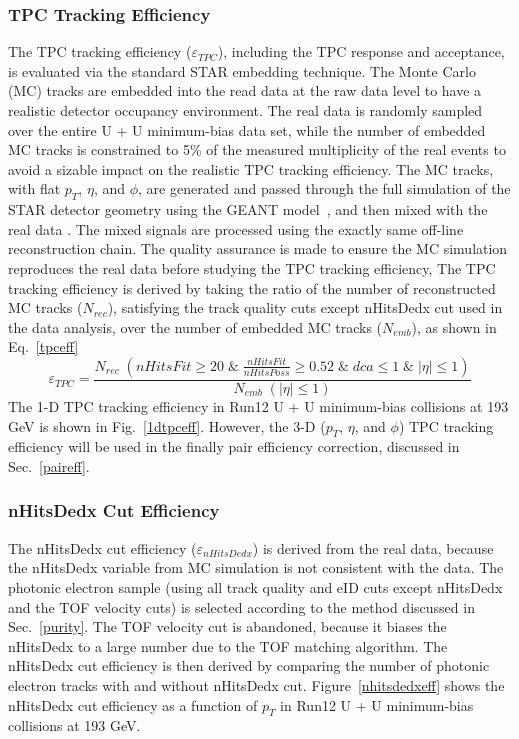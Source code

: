 \subsubsection{TPC Tracking Efficiency}
\label{embedding}
The TPC tracking efficiency ($\varepsilon_{TPC}$), including the TPC response and acceptance, is evaluated via the standard STAR embedding technique. The Monte Carlo (MC) tracks are embedded into the read data at the raw data level to have a realistic detector occupancy environment. The real data is randomly sampled over the entire U + U minimum-bias data set, while the number of embedded MC tracks is constrained to 5\% of the measured multiplicity of the real events to avoid a sizable impact on the realistic TPC tracking efficiency. The MC tracks, with flat $p_{T}$, $\eta$, and $\phi$, are generated and passed through the full simulation of the STAR detector geometry using the GEANT model~\cite{GEANT}, and then mixed with the real data . The mixed signals are processed using the exactly same off-line reconstruction chain. The quality assurance is made to ensure the MC simulation reproduces the real data before studying the TPC tracking efficiency, The TPC tracking efficiency is derived by taking the ratio of the number of reconstructed MC tracks ($N_{rec}$), satisfying the track quality cuts except nHitsDedx cut used in the data analysis, over the number of embedded MC tracks ($N_{emb}$), as shown in Eq.~\ref{tpceff}
\begin{equation}
\varepsilon_{TPC} = \frac{N_{rec}\;(nHitsFit\geq20\;\&\;\frac{nHitsFit}{nHitsPoss}\geq0.52\;\&\;dca\leq1\;\&\;|\eta|\leq1)}{N_{emb}\;(|\eta|\leq1)}
\label{tpceff}
\end{equation}
The 1-D TPC tracking efficiency in Run12 U + U minimum-bias collisions at 193 GeV is shown in Fig.~\ref{1dtpceff}. However, the 3-D ($p_{T}$, $\eta$, and $\phi$) TPC tracking efficiency will be used in the finally pair efficiency correction, discussed in Sec.~\ref{paireff}.

\subsubsection{nHitsDedx Cut Efficiency}
The nHitsDedx cut efficiency ($\varepsilon_{nHitsDedx}$) is derived from the real data, because the nHitsDedx variable from MC simulation is not consistent with the data. The photonic electron sample (using all track quality and eID cuts except nHitsDedx and the TOF velocity cuts) is selected according to the method discussed in  Sec.~\ref{purity}. The TOF velocity cut is abandoned, because it biases the nHitsDedx to a large number due to the TOF matching algorithm. The nHitsDedx cut efficiency is then derived by comparing the number of photonic electron tracks with and without nHitsDedx cut. Figure~\ref{nhitsdedxeff} shows the nHitsDedx cut efficiency as a function of $p_{T}$ in Run12 U + U minimum-bias collisions at 193 GeV.

